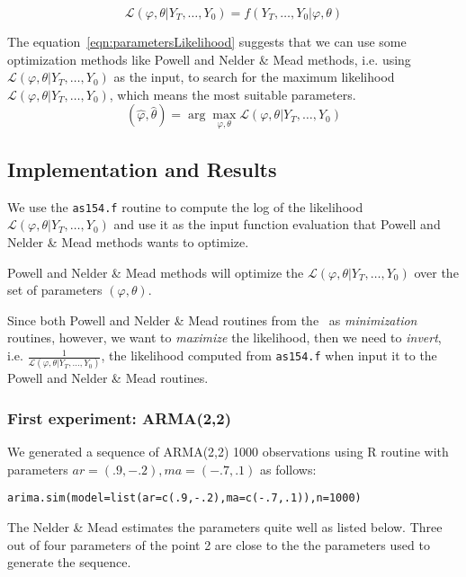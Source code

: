 \documentclass{article}
\begin{document}
\begin{equation}\label{eqn:parametersLikelihood}
\mathcal{L}(\varphi, \theta|Y_T,\ldots, Y_0) = f(Y_T,\ldots,Y_0|\varphi,
\theta)
\end{equation}

The equation~\ref{eqn:parametersLikelihood} suggests that we can use some
optimization methods like Powell and Nelder \& Mead methods, i.e. using
$\mathcal{L}(\varphi, \theta|Y_T,\ldots, Y_0)$ as the input, to search for the
maximum likelihood $\mathcal{L}(\varphi, \theta|Y_T,\ldots, Y_0)$, which means
the most suitable parameters.
\begin{equation}
(\hat{\varphi},\hat{\theta})=\arg\max_{\varphi, \theta} \mathcal{L}(\varphi,
\theta|Y_T,\ldots, Y_0)
\end{equation}

 \subsection{Implementation and Results}
 We use the \texttt{as154.f} routine to compute the log of the likelihood
 $\mathcal{L}(\varphi, \theta|Y_T,\ldots, Y_0)$ and use it as the input
 function evaluation that Powell and  Nelder \& Mead methods wants to optimize.
 
 Powell and  Nelder \& Mead methods will optimize the  $\mathcal{L}(\varphi,
 \theta|Y_T,\ldots, Y_0)$  over the set of parameters $(\varphi, \theta)$.
 
 Since both Powell and  Nelder \& Mead routines from
 the~\cite{PressNumericalRecipes} as \textit{minimization} routines, however,
 we want to \textit{maximize} the likelihood, then we need to \textit{invert},
 i.e. $\frac{1}{\mathcal{L}(\varphi,
 \theta|Y_T,\ldots, Y_0)}$, the likelihood computed from \texttt{as154.f} when
 input it to the Powell and Nelder \& Mead routines.
 
 \subsubsection{First experiment: ARMA(2,2)}\label{sec:arma22}
 We generated a sequence of ARMA(2,2) 1000 observations using R routine with
 parameters $ar=(.9,-.2),ma=(-.7,.1)$ as follows:
 
 \texttt{arima.sim(model=list(ar=c(.9,-.2),ma=c(-.7,.1)),n=1000)}

The Nelder \& Mead estimates the parameters quite well as listed below. Three
out of four parameters of the point 2 are close to the the parameters used to
generate the sequence.
 
\end{document}
